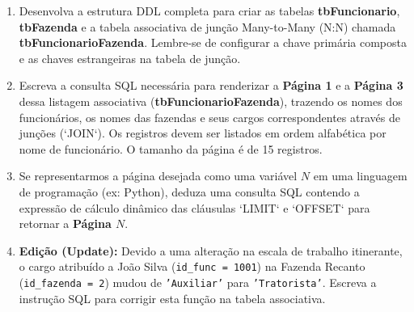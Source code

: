\documentclass[12pt,a4paper]{article}
\newcommand{\resposta}[1]{}
\begin{document}
\begin{center}
{%
    }
\end{center}

\vspace{0.4cm}

\begin{enumerate}[label=\textbf{\alph*)}]
    \item Desenvolva a estrutura DDL completa para criar as tabelas \textbf{tbFuncionario}, \textbf{tbFazenda} e a tabela associativa de junção Many-to-Many (N:N) chamada \textbf{tbFuncionarioFazenda}. Lembre-se de configurar a chave primária composta e as chaves estrangeiras na tabela de junção.
    \resposta{5cm}
    
    \item Escreva a consulta SQL necessária para renderizar a \textbf{Página 1} e a \textbf{Página 3} dessa listagem associativa (\textbf{tbFuncionarioFazenda}), trazendo os nomes dos funcionários, os nomes das fazendas e seus cargos correspondentes através de junções (`JOIN`). Os registros devem ser listados em ordem alfabética por nome de funcionário. O tamanho da página é de 15 registros.
    \resposta{4cm}

    \item Se representarmos a página desejada como uma variável $N$ em uma linguagem de programação (ex: Python), deduza uma consulta SQL contendo a expressão de cálculo dinâmico das cláusulas `LIMIT` e `OFFSET` para retornar a \textbf{Página $N$}.
    \resposta{2.5cm}

    \item \textbf{Edição (Update):} Devido a uma alteração na escala de trabalho itinerante, o cargo atribuído a João Silva (\texttt{id\_func = 1001}) na Fazenda Recanto (\texttt{id\_fazenda = 2}) mudou de \texttt{'Auxiliar'} para \texttt{'Tratorista'}. Escreva a instrução SQL para corrigir esta função na tabela associativa.
    \resposta{2.5cm}


\end{enumerate}
\end{document}
